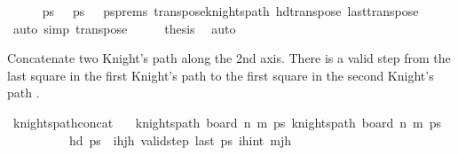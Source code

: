 \begin{isabellebody}
\ \ \ \ \isamarkupfalse%
\ {\isacartoucheopen}ps\ {\isasymnoteq}\ {\isacharbrackleft}{\kern0pt}{\isacharbrackright}{\kern0pt}{\isacartoucheclose}\ {\isacartoucheopen}ps\ {\isasymnoteq}\ {\isacharbrackleft}{\kern0pt}{\isacharbrackright}{\kern0pt}{\isacartoucheclose}\ ps{\isacharunderscore}{\kern0pt}prems\ transpose{\isacharunderscore}{\kern0pt}knights{\isacharunderscore}{\kern0pt}path\ hd{\isacharunderscore}{\kern0pt}transpose\ last{\isacharunderscore}{\kern0pt}transpose\ \isanewline
\ \ \ \ \isamarkupfalse%
\ {\isacharparenleft}{\kern0pt}auto\ simp{\isacharcolon}{\kern0pt}\ transpose{}{\isacharparenright}{\kern0pt}\isanewline
\ \ \isamarkupfalse%
\ \isamarkupfalse%
\ {\isacharquery}{\kern0pt}thesis\ \isamarkupfalse%
\ auto\isanewline
{}\isamarkupfalse%
%
\endisatagproof
{\isafoldproof}%
%
\isadelimproof
%
\endisadelimproof
%
\begin{isamarkuptext}%
Concatenate two Knight's path along the 2nd axis. There is a valid step from the last square 
in the first Knight's path  to the first square in the second Knight's path .%
\end{isamarkuptext}\isamarkuptrue%
\isamarkupfalse%
\ knights{\isacharunderscore}{\kern0pt}path{\isacharunderscore}{\kern0pt}concat{\isacharcolon}{\kern0pt}\isanewline
\ \ \ {\isachardoublequoteopen}knights{\isacharunderscore}{\kern0pt}path\ {\isacharparenleft}{\kern0pt}board\ n\ m\ ps\ {\isachardoublequoteopen}knights{\isacharunderscore}{\kern0pt}path\ {\isacharparenleft}{\kern0pt}board\ n\ m\ ps\ \isanewline
\ \ \ \ \ \ \ \ \ \ {\isachardoublequoteopen}hd\ ps\ {\isacharequal}{\kern0pt}\ {\isacharparenleft}{\kern0pt}i\isactrlsub h{\isacharcomma}{\kern0pt}j\isactrlsub h{\isacharparenright}{\kern0pt}{\isachardoublequoteclose}\ {\isachardoublequoteopen}valid{\isacharunderscore}{\kern0pt}step\ {\isacharparenleft}{\kern0pt}last\ ps\ {\isacharparenleft}{\kern0pt}i\isactrlsub h{\isacharcomma}{\kern0pt}int\ mj\isactrlsub h{\isacharparenright}{\kern0pt}{\isachardoublequoteclose}\isanewline

\end{isabellebody}
